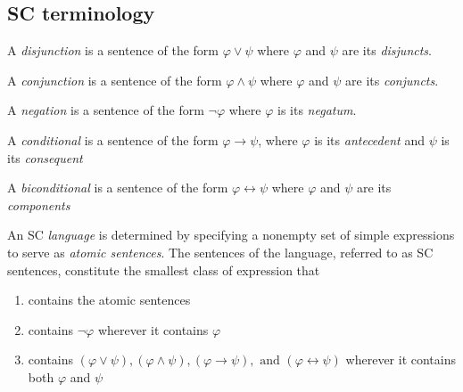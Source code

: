 \subsection{SC terminology}
\begin{definition}
	A \textit{disjunction} is a sentence of the form $\varphi \lor \psi$ where
	$\varphi$ and $\psi$ are its \textit{disjuncts}.
\end{definition}
\begin{definition}
	A \textit{conjunction} is a sentence of the form $\varphi \land \psi$ where
	$\varphi$ and $\psi$ are its \textit{conjuncts}.
\end{definition}
\begin{definition}
	A \textit{negation} is a sentence of the form $\lnot \varphi$ where
	$\varphi$ is its \textit{negatum}.
\end{definition}
\begin{definition}
	A \textit{conditional} is a sentence of the form $\varphi \to \psi$, where
	$\varphi$ is its \textit{antecedent} and $\psi$ is its \textit{consequent}
\end{definition}
\begin{definition}
	A \textit{biconditional} is a sentence of the form $\varphi \leftrightarrow
		\psi$ where $\varphi$ and $\psi$ are its \textit{components}
\end{definition}
\begin{definition}[SC language]
	An SC \textit{language} is determined by specifying a nonempty set of
	simple expressions to serve as \textit{atomic sentences}. The sentences of
	the language, referred to as SC sentences, constitute the smallest class of
	expression that
	\begin{enumerate}
		\item contains the atomic sentences
		\item contains $\lnot \varphi$ wherever it contains $\varphi$
		\item contains $(\varphi \lor \psi), (\varphi \land \psi), (\varphi
			      \to \psi), \text{ and } (\varphi \leftrightarrow \psi)$
		      wherever it contains both $\varphi$ and $\psi$
	\end{enumerate}
\end{definition}

